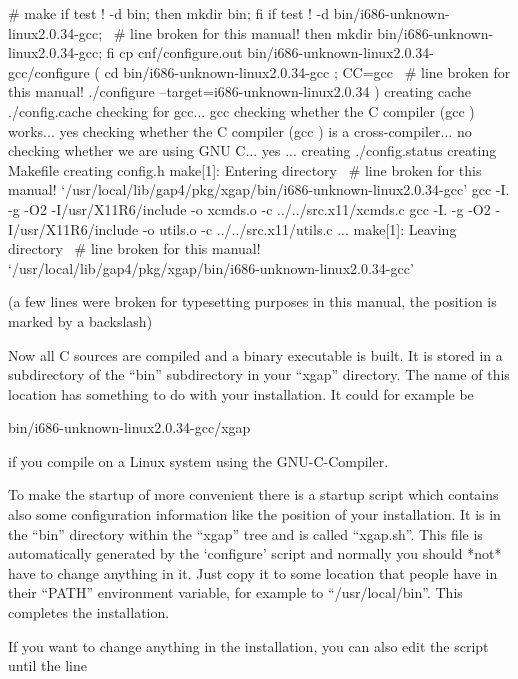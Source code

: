 \begintt
# make
if test ! -d bin;  then mkdir bin;  fi
if test ! -d bin/i686-unknown-linux2.0.34-gcc; \ # line broken for this manual!
                then mkdir bin/i686-unknown-linux2.0.34-gcc;  fi
cp cnf/configure.out bin/i686-unknown-linux2.0.34-gcc/configure
( cd bin/i686-unknown-linux2.0.34-gcc ; CC=gcc \ # line broken for this manual!
                ./configure --target=i686-unknown-linux2.0.34  )
creating cache ./config.cache
checking for gcc... gcc
checking whether the C compiler (gcc  ) works... yes
checking whether the C compiler (gcc  ) is a cross-compiler... no
checking whether we are using GNU C... yes
...
creating ./config.status
creating Makefile
creating config.h
make[1]: Entering directory \                   # line broken for this manual!
     `/usr/local/lib/gap4/pkg/xgap/bin/i686-unknown-linux2.0.34-gcc'
gcc -I. -g -O2 -I/usr/X11R6/include  -o xcmds.o -c ../../src.x11/xcmds.c
gcc -I. -g -O2 -I/usr/X11R6/include  -o utils.o -c ../../src.x11/utils.c
...
make[1]: Leaving directory \                    # line broken for this manual!
     `/usr/local/lib/gap4/pkg/xgap/bin/i686-unknown-linux2.0.34-gcc'
\endtt

(a few lines were broken for typesetting purposes in this manual, the
position is marked by a backslash) 

Now all C sources are compiled and a binary executable is built. It is
stored in a subdirectory of the ``bin'' subdirectory in your ``xgap''
directory. The name of this location has something to do with your
installation. It could for example be

\begintt
bin/i686-unknown-linux2.0.34-gcc/xgap
\endtt

if you compile on a Linux system using the GNU-C-Compiler.


To make the startup of {\XGAP} more convenient there is a startup script
which contains also some configuration information like the position of
your {\GAP} installation. It is in the ``bin'' directory within the
``xgap'' tree and is called ``xgap.sh''. This file is automatically generated
by the `configure' script and normally you should *not* have to change 
anything in it. Just copy it to some location that people have in their
``PATH'' environment variable, for example to ``/usr/local/bin''.
This completes the installation.

If you want to change anything in the installation, you
can also edit the script until the line

